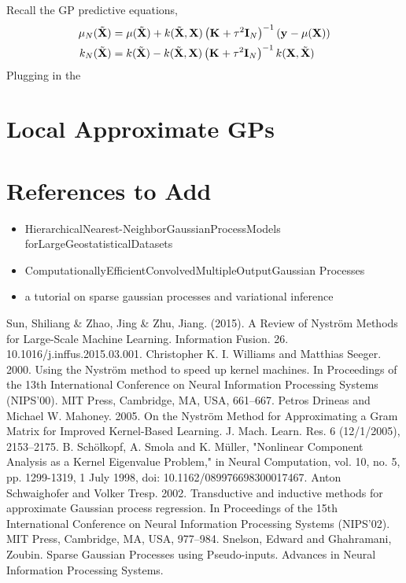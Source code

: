 \documentclass[12pt]{article}
\begin{document}
Recall the GP predictive equations, 
\begin{align}
\GPMeanPred[\Ndesign](\predictMat) &= \GPMean(\predictMat) + \GPKer(\predictMat, \designMat) \left(\kerMat + \nugget^2 \I[\Ndesign] \right)^{-1} \left(\yObs - \GPMean(\designMat) \right) \\
\GPKerPred[\Ndesign](\predictMat) &= \GPKer(\predictMat) - \GPKer(\predictMat, \designMat) \left(\kerMat + \nugget^2 \I[\Ndesign] \right)^{-1} \GPKer(\designMat, \predictMat)
\end{align}
Plugging in the 




\section{Local Approximate GPs}

\section{References to Add}
\begin{itemize}
\item HierarchicalNearest-NeighborGaussianProcessModels forLargeGeostatisticalDatasets
\item ComputationallyEfficientConvolvedMultipleOutputGaussian Processes
\item a tutorial on sparse gaussian processes and variational inference
\end{itemize}


\begin{thebibliography}{20}
 Sun, Shiliang \& Zhao, Jing \& Zhu, Jiang. (2015). A Review of Nyström Methods for Large-Scale Machine Learning. Information Fusion. 26. 10.1016/j.inffus.2015.03.001. 
 Christopher K. I. Williams and Matthias Seeger. 2000. Using the Nyström method to speed up kernel machines. In Proceedings of the 13th International Conference on Neural Information Processing Systems (NIPS'00). MIT Press, Cambridge, MA, USA, 661–667.
 Petros Drineas and Michael W. Mahoney. 2005. On the Nyström Method for Approximating a Gram Matrix for Improved Kernel-Based Learning. J. Mach. Learn. Res. 6 (12/1/2005), 2153–2175.
 B. Schölkopf, A. Smola and K. Müller, "Nonlinear Component Analysis as a Kernel Eigenvalue Problem," in Neural Computation, vol. 10, no. 5, pp. 1299-1319, 1 July 1998, doi: 10.1162/089976698300017467.
 Anton Schwaighofer and Volker Tresp. 2002. Transductive and inductive methods for approximate Gaussian process regression. In Proceedings of the 15th International Conference on Neural Information Processing Systems (NIPS'02). MIT Press, Cambridge, MA, USA, 977–984.
 Snelson, Edward and Ghahramani, Zoubin. Sparse Gaussian Processes using Pseudo-inputs. Advances in Neural Information Processing Systems. %

\end{thebibliography}
\end{document}
